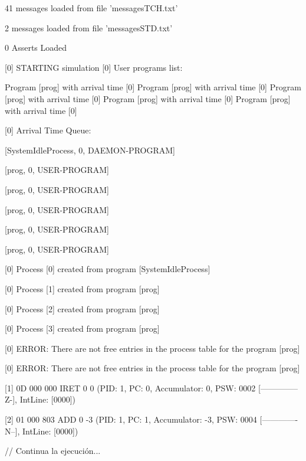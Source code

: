
41 messages loaded from file 'messagesTCH.txt'

2 messages loaded from file 'messagesSTD.txt'

0 Asserts Loaded

[\textcolor{termred}{0}] 
\textcolor{termred}{STARTING simulation
}
[\textcolor{termred}{0}] 
User programs list:

	Program [\textcolor{termcyan}{prog}] with arrival time [\textcolor{termcyan}{0}]
	Program [\textcolor{termcyan}{prog}] with arrival time [\textcolor{termcyan}{0}]
	Program [\textcolor{termcyan}{prog}] with arrival time [\textcolor{termcyan}{0}]
	Program [\textcolor{termcyan}{prog}] with arrival time [\textcolor{termcyan}{0}]
	Program [\textcolor{termcyan}{prog}] with arrival time [\textcolor{termcyan}{0}]
	
[\textcolor{termred}{0}] 
Arrival Time Queue:

		[\textcolor{termgreen}{SystemIdleProcess}, \textcolor{termred}{0}, \textcolor{termgreen}{DAEMON-PROGRAM}]

		[\textcolor{termgreen}{prog}, \textcolor{termred}{0}, \textcolor{termgreen}{USER-PROGRAM}]

		[\textcolor{termgreen}{prog}, \textcolor{termred}{0}, \textcolor{termgreen}{USER-PROGRAM}]

		[\textcolor{termgreen}{prog}, \textcolor{termred}{0}, \textcolor{termgreen}{USER-PROGRAM}]

		[\textcolor{termgreen}{prog}, \textcolor{termred}{0}, \textcolor{termgreen}{USER-PROGRAM}]

		[\textcolor{termgreen}{prog}, \textcolor{termred}{0}, \textcolor{termgreen}{USER-PROGRAM}]

	
[\textcolor{termred}{0}] 
\textcolor{termgreen}{Process [0] created from program [SystemIdleProcess]}

	
[\textcolor{termred}{0}] 
\textcolor{termgreen}{Process [1] created from program [prog]}

	
[\textcolor{termred}{0}] 
\textcolor{termgreen}{Process [2] created from program [prog]}

	
[\textcolor{termred}{0}] 
\textcolor{termgreen}{Process [3] created from program [prog]}

	
[\textcolor{termred}{0}] 
\textcolor{termred}{ERROR: There are not free entries in the process table for the program [prog]}

	
[\textcolor{termred}{0}] 
\textcolor{termred}{ERROR: There are not free entries in the process table for the program [prog]}

[\textcolor{termred}{1}] 
{0D 000 000}
 IRET 0 0 (PID: \textcolor{termgreen}{1}, PC: \textcolor{termred}{0}, Accumulator: \textcolor{termred}{0}, PSW: \textcolor{termred}{0002} [\textcolor{termred}{--------------Z-}], IntLine: [\textcolor{termred}{0000}])

[2] 
{01 000 803}
 ADD 0 -3 (PID: \textcolor{termgreen}{1}, PC: \textcolor{termred}{1}, Accumulator: \textcolor{termred}{-3}, PSW: \textcolor{termred}{0004} [\textcolor{termred}{-------------N--}], IntLine: [\textcolor{termred}{0000}])

 // Continua la ejecución...